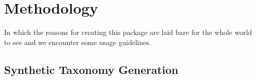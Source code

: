 \chapter{Methodology}

\begin{center}
    \begin{minipage}{0.5\textwidth}
        \begin{small}
            In which the reasons for creating this package are laid bare for the
            whole world to see and we encounter some usage guidelines.
        \end{small}
    \end{minipage}
    \vspace{0.5cm}
\end{center}

\section{Synthetic Taxonomy Generation}


